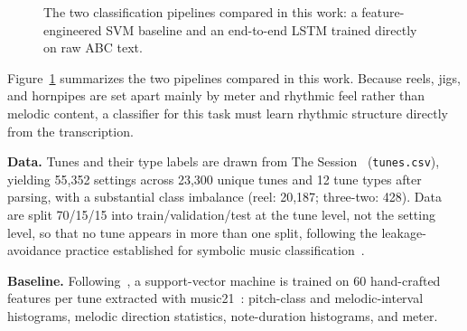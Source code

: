 \documentclass{article}
\begin{document}
\begin{figure}[t]
\centering
{}
\caption{The two classification pipelines compared in this work: a feature-engineered SVM baseline and an end-to-end LSTM trained directly on raw ABC text.}
\label{fig:pipeline}
\end{figure}

Figure~\ref{fig:pipeline} summarizes the two pipelines compared in this work. Because reels, jigs, and hornpipes are set apart mainly by meter and rhythmic feel rather than melodic content, a classifier for this task must learn rhythmic structure directly from the transcription.

\textbf{Data.} Tunes and their type labels are drawn from The Session~\cite{TheSession} (\texttt{tunes.csv}), yielding 55,352 settings across 23,300 unique tunes and 12 tune types after parsing, with a substantial class imbalance (reel: 20,187; three-two: 428). Data are split 70/15/15 into train/validation/test at the tune level, not the setting level, so that no tune appears in more than one split, following the leakage-avoidance practice established for symbolic music classification~\cite{Zhang2023}.

\textbf{Baseline.} Following~\cite{Kermit2015,Martins2015}, a support-vector machine is trained on 60 hand-crafted features per tune extracted with music21~\cite{Cuthbert2010}: pitch-class and melodic-interval histograms, melodic direction statistics, note-duration histograms, and meter.
\end{document}

